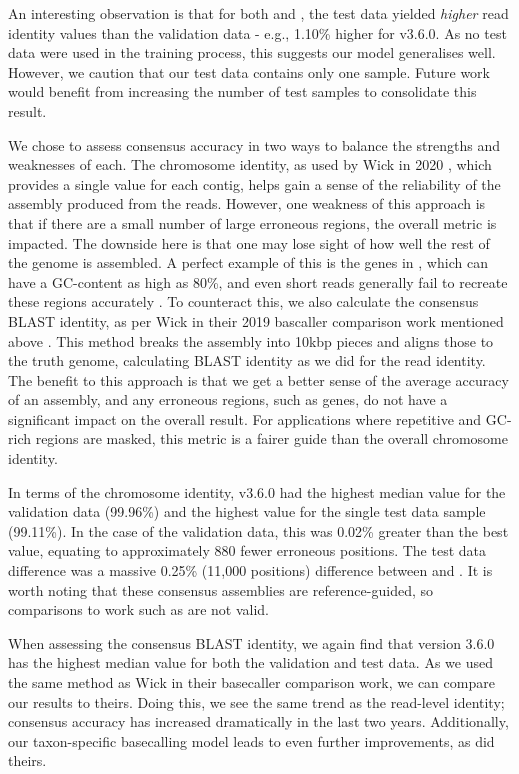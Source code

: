 An interesting observation is that for both \guppy{} and \tubby{}, the test data yielded \emph{higher} read identity values than the validation data - e.g., 1.10\% higher for \tubby{} v3.6.0. As no test data were used in the training process, this suggests our model generalises well. However, we caution that our test data contains only one sample. Future work would benefit from increasing the number of test samples to consolidate this result.

\noindent
We chose to assess consensus accuracy in two ways to balance the strengths and weaknesses of each. The chromosome identity, as used by Wick \etal{} in 2020 \cite{wick2020}, which provides a single value for each contig, helps gain a sense of the reliability of the assembly produced from the \ont{} reads. However, one weakness of this approach is that if there are a small number of large erroneous regions, the overall metric is impacted. The downside here is that one may lose sight of how well the rest of the genome is assembled. A perfect example of this is the \ppe{} genes in \mtb{}, which can have a GC-content as high as 80\%, and even short reads generally fail to recreate these regions accurately \cite{Phelan2016}.  To counteract this, we also calculate the consensus BLAST identity, as per Wick \etal{} in their 2019 bascaller comparison work mentioned above \cite{wick2019}. This method breaks the assembly into 10kbp pieces and aligns those to the truth genome, calculating BLAST identity as we did for the read identity. The benefit to this approach is that we get a better sense of the average accuracy of an assembly, and any erroneous regions, such as \ppe{} genes, do not have a significant impact on the overall result. For applications where repetitive and GC-rich regions are masked, this metric is a fairer guide than the overall chromosome identity.

In terms of the chromosome identity, \tubby{} v3.6.0 had the highest median value for the validation data (99.96\%) and the highest value for the single test data sample (99.11\%). In the case of the validation data, this was 0.02\% greater than the best \guppy{} value, equating to approximately 880 fewer erroneous positions. The test data difference was a massive 0.25\% (11,000 positions) difference between \tubby{} and \guppy{}. It is worth noting that these consensus assemblies are reference-guided, so comparisons to work such as \cite{wick2020} are not valid.

When assessing the consensus BLAST identity, we again find that \tubby{} version 3.6.0 has the highest median value for both the validation and test data. As we used the same method as Wick \etal{} in their basecaller comparison work, we can compare our results to theirs. Doing this, we see the same trend as the read-level identity; consensus accuracy has increased dramatically in the last two years. Additionally, our taxon-specific basecalling model leads to even further improvements, as did theirs. 

